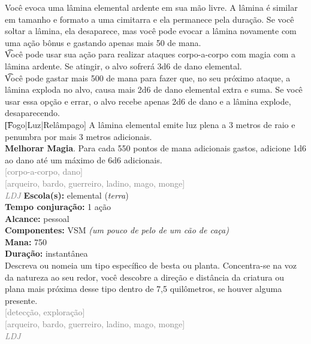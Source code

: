 \documentclass{RPG_Adventure}[2021/10/20]
\begin{document}
{\normalsize Você evoca uma lâmina elemental ardente em sua mão livre. A lâmina é similar em tamanho e formato a uma cimitarra e ela permanece pela duração. Se você soltar a lâmina, ela desaparece, mas você pode evocar a lâmina novamente com uma ação bônus e gastando apenas mais 50 de mana.\\\t Você pode usar sua ação para realizar ataques corpo-a-corpo com magia com a lâmina ardente. Se atingir, o alvo sofrerá 3d6 de dano elemental.\\\t Você pode gastar mais 500 de mana para fazer que, no seu próximo ataque, a lâmina exploda no alvo, causa mais 2d6 de dano elemental extra e suma. Se você usar essa opção e errar, o alvo recebe apenas 2d6 de dano e a lâmina explode, desaparecendo.\\\t [Fogo|Luz|Relâmpago] A lâmina elemental emite luz plena a 3 metros de raio e penumbra por mais 3 metros adicionais.\\\t \textbf{Melhorar Magia}. Para cada 550 pontos de mana adicionais gastos, adicione 1d6 ao dano até um máximo de 6d6 adicionais.\\}
{\scriptsize \textcolor{gray}{[corpo-a-corpo, dano]\\}}
{\scriptsize \textcolor{gray}{[arqueiro, bardo, guerreiro, ladino, mago, monge]\\}}
{\tiny \textcolor{gray}{\textit{LDJ}}}\jump{}
{\small \t \textbf{Escola(s):} elemental (\textit{terra})\\\t \textbf{Tempo conjuração:} 1 ação\\\t \textbf{Alcance:} pessoal\\\t \textbf{Componentes:} VSM \textit{(um pouco de pelo de um cão de caça)}\\\t \textbf{Mana:} 750\\\t \textbf{Duração:} instantânea\\}
{\normalsize Descreva ou nomeia um tipo específico de besta ou planta. Concentra-se na voz da natureza ao seu redor, você descobre a direção e distância da criatura ou plana mais próxima desse tipo dentro de 7,5 quilômetros, se houver alguma presente.\\}
{\scriptsize \textcolor{gray}{[detecção, exploração]\\}}
{\scriptsize \textcolor{gray}{[arqueiro, bardo, guerreiro, ladino, mago, monge]\\}}
{\tiny \textcolor{gray}{\textit{LDJ}}}\jump{}
\end{document}
